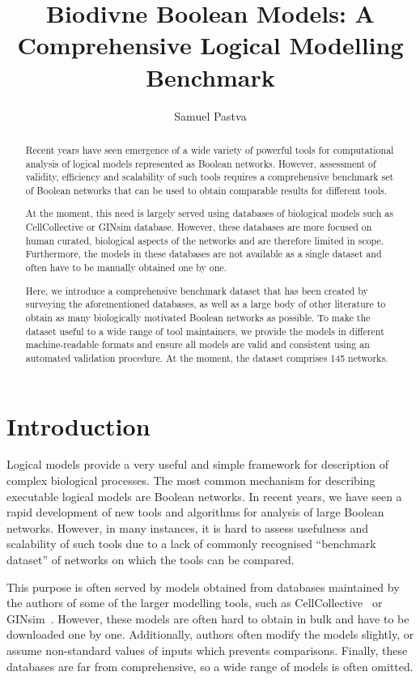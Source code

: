 \documentclass{article}
\title{Biodivne Boolean Models: A Comprehensive Logical Modelling Benchmark}
\author{Samuel Pastva}
\date{}
\begin{document}
\maketitle

\begin{abstract}
	Recent years have seen emergence of a wide variety of powerful tools for computational analysis of logical models represented as Boolean networks. However, assessment of validity, efficiency and scalability of such tools requires a comprehensive benchmark set of Boolean networks that can be used to obtain comparable results for different tools.
	
	At the moment, this need is largely served using databases of biological models such as CellCollective or GINsim database. However, these databases are more focused on human curated, biological aspects of the networks and are therefore limited in scope. Furthermore, the models in these databases are not available as a single dataset and often have to be manually obtained one by one.
	
	Here, we introduce a comprehensive benchmark dataset that has been created by surveying the aforementioned databases, as well as a large body of other literature to obtain as many biologically motivated Boolean networks as possible. To make the dataset useful to a wide range of tool maintainers, we provide the models in different machine-readable formats and ensure all models are valid and consistent using an automated validation procedure. At the moment, the dataset comprises 145 networks.
\end{abstract}

\section{Introduction}

Logical models provide a very useful and simple framework for description of complex biological processes. The most common mechanism for describing executable logical models are Boolean networks. In recent years, we have seen a rapid development of new tools and algorithms for analysis of large Boolean networks. However, in many instances, it is hard to assess usefulness and scalability of such tools due to a lack of commonly recognised ``benchmark dataset'' of networks on which the tools can be compared.

This purpose is often served by models obtained from databases maintained by the authors of some of the larger modelling tools, such as CellCollective~\cite{cell-collective} or GINsim~\cite{ginsim}. However, these models are often hard to obtain in bulk and have to be downloaded one by one. Additionally, authors often modify the models slightly, or assume non-standard values of inputs which prevents comparisons. Finally, these databases are far from comprehensive, so a wide range of models is often omitted.
\end{document}
